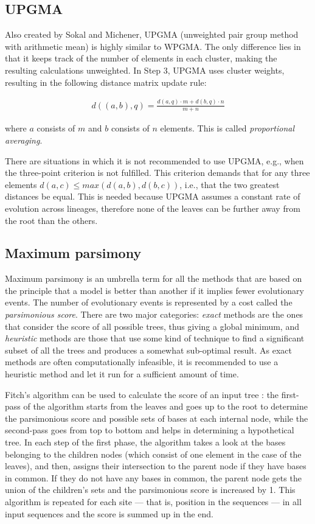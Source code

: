 \documentclass[11pt,twocolumn]{article}
\begin{document}
\subsection{UPGMA}

Also created by Sokal and Michener, UPGMA (unweighted pair group method with arithmetic mean) is highly similar to WPGMA. The only difference lies in that it keeps track of the number of elements in each cluster, making the resulting calculations unweighted. In Step 3, UPGMA uses cluster weights, resulting in the following distance matrix update rule:

\begin{align}
d((a, b), q) = \frac{d(a, q) \cdot m + d(b, q) \cdot n}{m + n}
\end{align}

where $a$ consists of $m$ and $b$ consists of $n$ elements. This is called \textit{proportional averaging}.

There are situations in which it is not recommended to use UPGMA, e.g., when the three-point criterion is not fulfilled. This criterion demands that for any three elements $d(a, c) \le max(d(a, b), d(b, c))$, i.e., that the two greatest distances be equal. This is needed because UPGMA assumes a constant rate of evolution across lineages, therefore none of the leaves can be further away from the root than the others.

\subsection{Maximum parsimony}

Maximum parsimony is an umbrella term for all the methods that are based on the principle that a model is better than another if it implies fewer evolutionary events. The number of evolutionary events is represented by a cost called the \textit{parsimonious score}. There are two major categories: \textit{exact} methods are the ones that consider the score of all possible trees, thus giving a global minimum, and \textit{heuristic} methods are those that use some kind of technique to find a significant subset of all the trees and produces a somewhat sub-optimal result. As exact methods are often computationally infeasible, it is recommended to use a heuristic method and let it run for a sufficient amount of time.

Fitch's algorithm \cite{Fitch1971} can be used to calculate the score of an input tree  \cite{Ortiz2016} \cite{Stoye2009}: the first-pass of the algorithm starts from the leaves and goes up to the root to determine the parsimonious score and possible sets of bases at each internal node, while the second-pass goes from top to bottom and helps in determining a hypothetical tree. In each step of the first phase, the algorithm takes a look at the bases belonging to the children nodes (which consist of one element in the case of the leaves), and then, assigns their intersection to the parent node if they have bases in common. If they do not have any bases in common, the parent node gets the union of the children's sets and the parsimonious score is increased by 1. This algorithm is repeated for each site — that is, position in the sequences — in all input sequences and the score is summed up in the end.
\end{document}
